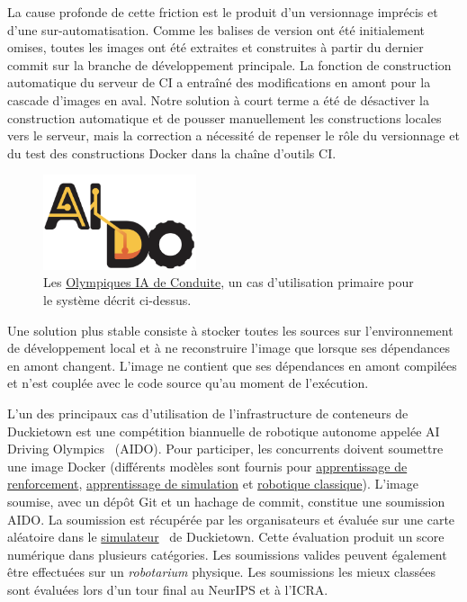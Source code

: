 La cause profonde de cette friction est le produit d'un versionnage imprécis et d'une sur-automatisation. Comme les balises de version ont été initialement omises, toutes les images ont été extraites et construites à partir du dernier commit sur la branche de développement principale. La fonction de construction automatique du serveur de CI a entraîné des modifications en amont pour la cascade d'images en aval. Notre solution à court terme a été de désactiver la construction automatique et de pousser manuellement les constructions locales vers le serveur, mais la correction a nécessité de repenser le rôle du versionnage et du test des constructions Docker dans la chaîne d'outils CI.

\begin{figure}
\includegraphics[width=0.40\textwidth]{../figures/aido_logo.png}
\caption{Les \href{https://www.duckietown.org/research/ai-driving-olympics}{Olympiques IA de Conduite}, un cas d'utilisation primaire pour le système décrit ci-dessus.}
\label{fig:aido_logo}
\end{figure}

Une solution plus stable consiste à stocker toutes les sources sur l'environnement de développement local et à ne reconstruire l'image que lorsque ses dépendances en amont changent. L'image ne contient que ses dépendances en amont compilées et n'est couplée avec le code source qu'au moment de l'exécution.

L'un des principaux cas d'utilisation de l'infrastructure de conteneurs de Duckietown est une compétition biannuelle de robotique autonome appelée AI Driving Olympics~\citep{aido2018} (AIDO). Pour participer, les concurrents doivent soumettre une image Docker (différents modèles sont fournis pour \href{https://github.com/duckietown/challenge-aido_LF-baseline-RL-sim-pytorch}{apprentissage de renforcement}, \href{https://github.com/duckietown/challenge-aido_LF-baseline-IL-logs-tensorflow}{apprentissage de simulation} et \href{https://github.com/duckietown/challenge-aido_LF-template-ros}{robotique classique}). L'image soumise, avec un dépôt Git et un hachage de commit, constitue une soumission AIDO. La soumission est récupérée par les organisateurs et évaluée sur une carte aléatoire dans le \href{https://github.com/duckietown/gym-duckietown}{simulateur}~\citep{gym_duckietown} de Duckietown. Cette évaluation produit un score numérique dans plusieurs catégories. Les soumissions valides peuvent également être effectuées sur un \textit{robotarium} physique. Les soumissions les mieux classées sont évaluées lors d'un tour final au NeurIPS et à l'ICRA.

